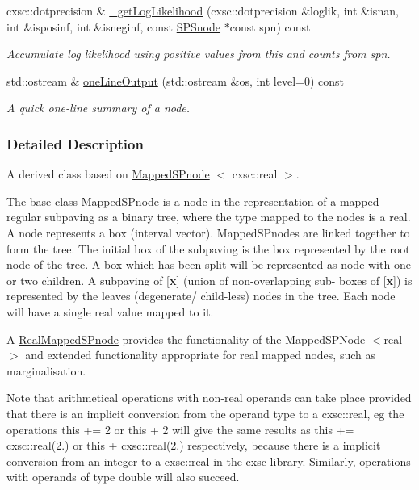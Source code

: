 \begin{DoxyCompactItemize}
cxsc\-::dotprecision \& \hyperlink{classsubpavings_1_1RealMappedSPnode_aa65475d7ae1efb7ba1c7cd5bd0c13c5d}{\-\_\-get\-Log\-Likelihood} (cxsc\-::dotprecision \&loglik, int \&isnan, int \&isposinf, int \&isneginf, const \hyperlink{classsubpavings_1_1SPSnode}{\-S\-P\-Snode} $\ast$const spn) const 
\begin{DoxyCompactList}\small\item\em \-Accumulate log likelihood using positive values from this and counts from {\itshape spn\/}. \end{DoxyCompactList}\item 
std\-::ostream \& \hyperlink{classsubpavings_1_1RealMappedSPnode_a5287c7cec21af1c8606d735c0478a6fc}{one\-Line\-Output} (std\-::ostream \&os, int level=0) const 
\begin{DoxyCompactList}\small\item\em \-A quick one-\/line summary of a node. \end{DoxyCompactList}\end{DoxyCompactItemize}


\subsubsection{\-Detailed \-Description}
\-A derived class based on \hyperlink{classsubpavings_1_1MappedSPnode}{\-Mapped\-S\-Pnode} $<$ cxsc\-::real $>$. 

\-The base class \hyperlink{classsubpavings_1_1MappedSPnode}{\-Mapped\-S\-Pnode} is a node in the representation of a mapped regular subpaving as a binary tree, where the type mapped to the nodes is a real. \-A node represents a box (interval vector). \-Mapped\-S\-Pnodes are linked together to form the tree. \-The initial box of the subpaving is the box represented by the root node of the tree. \-A box which has been split will be represented as node with one or two children. \-A subpaving of \mbox{[}{\bfseries x}\mbox{]} (union of non-\/overlapping sub-\/ boxes of \mbox{[}{\bfseries x}\mbox{]}) is represented by the leaves (degenerate/ child-\/less) nodes in the tree. \-Each node will have a single real value mapped to it.

\-A \hyperlink{classsubpavings_1_1RealMappedSPnode}{\-Real\-Mapped\-S\-Pnode} provides the functionality of the \-Mapped\-S\-P\-Node $<$real$>$ and extended functionality appropriate for real mapped nodes, such as marginalisation.

\-Note that arithmetical operations with non-\/real operands can take place provided that there is an implicit conversion from the operand type to a cxsc\-::real, eg the operations this += 2 or this + 2 will give the same results as this += cxsc\-::real(2.) or this + cxsc\-::real(2.) respectively, because there is a implicit conversion from an integer to a cxsc\-::real in the cxsc library. \-Similarly, operations with operands of type double will also succeed.

